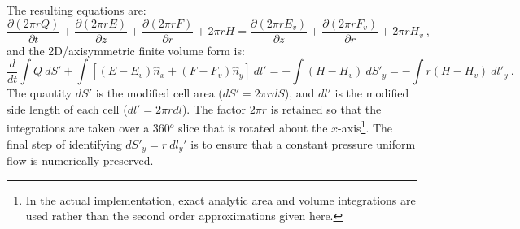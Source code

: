The resulting equations are:
\begin{equation}
\frac{\partial (2 \pi r Q)}{\partial t} + \frac{\partial (2 \pi r E)}{\partial z} + \frac{\partial (2 \pi r F)}{\partial r} + 2 \pi r H =
\frac{\partial ( 2 \pi r E_v)}{\partial z} + \frac{\partial (2 \pi r F_v)}{\partial r} + 2 \pi r H_v ~ ,
\end{equation}
and the 2D/axisymmetric finite volume form is:
\begin{equation}
\frac{d}{dt} \int Q ~dS' +
\int \left [ (E-E_v)\hat{n}_x + (F-F_v)\hat{n}_y \right ] ~dl' = - \int (H - H_v) ~dS'_y = 
- \int r (H - H_v) ~dl'_y ~ .
\end{equation}
The quantity $dS'$ is the modified cell area ($dS' = 2 \pi r dS$), and $dl'$ is the modified side length of each cell ($dl' = 2 \pi r dl$).  The factor $2 \pi r$ is retained so that the integrations are taken over a 360$^o$ slice that is rotated about the $x$-axis\footnote{In the actual implementation, exact analytic area and volume integrations are used rather than the second order approximations given here.}.  The final step of identifying $dS'_y = r ~dl_y'$ is to ensure that a constant pressure uniform flow is numerically preserved.

